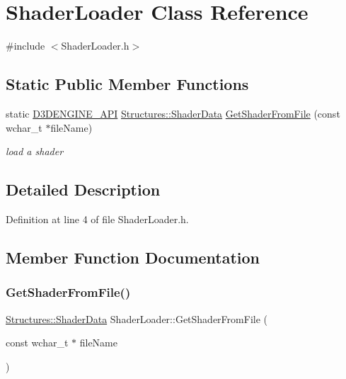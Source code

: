\hypertarget{class_shader_loader}{}\section{Shader\+Loader Class Reference}
\label{class_shader_loader}


{\ttfamily \#include $<$Shader\+Loader.\+h$>$}

\subsection*{Static Public Member Functions}
\begin{DoxyCompactItemize}
\item 
static \mbox{\hyperlink{stdafx_8h_a8ee2d990c5dfba7794dd2b60741d7722}{D3\+D\+E\+N\+G\+I\+N\+E\+\_\+\+A\+PI}} \mbox{\hyperlink{struct_structures_1_1_shader_data}{Structures\+::\+Shader\+Data}} \mbox{\hyperlink{class_shader_loader_a03ac0f20fd62c16e2604a6a8ef22efc4}{Get\+Shader\+From\+File}} (const wchar\+\_\+t $\ast$file\+Name)
\begin{DoxyCompactList}\small\item\em load a shader \end{DoxyCompactList}\end{DoxyCompactItemize}


\subsection{Detailed Description}


Definition at line 4 of file Shader\+Loader.\+h.



\subsection{Member Function Documentation}
\mbox{\label{class_shader_loader_a03ac0f20fd62c16e2604a6a8ef22efc4}} 
\subsubsection{\texorpdfstring{Get\+Shader\+From\+File()}{GetShaderFromFile()}}
{\footnotesize\ttfamily \mbox{\hyperlink{struct_structures_1_1_shader_data}{Structures\+::\+Shader\+Data}} Shader\+Loader\+::\+Get\+Shader\+From\+File (\begin{DoxyParamCaption}\item[{const wchar\+\_\+t $\ast$}]{file\+Name }\end{DoxyParamCaption})\hspace{0.3cm}{\ttfamily [static]}}



